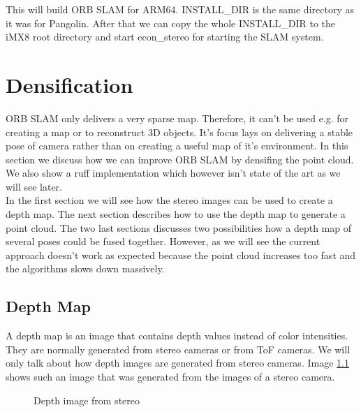 \documentclass[11pt,a4paper,titlepage,oneside]{report}
\begin{document}
This will build ORB SLAM for ARM64. INSTALL\_DIR is the same directory as it was for Pangolin. After that we can copy the whole INSTALL\_DIR to the iMX8 root directory and start econ\_stereo for starting the SLAM system.

\chapter{Densification}

ORB SLAM only delivers a very sparse map. Therefore, it can't be used e.g. for creating a map or to reconstruct 3D objects. It's focus lays on delivering a stable pose of camera rather than on creating a useful map of it's environment. In this section we discuss how we can improve ORB SLAM by densifing the point cloud. We also show a ruff implementation which however isn't state of the art as we will see later.\\
In the first section we will see how the stereo images can be used to create a depth map. The next section describes how to use the depth map to generate a point cloud. The two last sections discusses two possibilities how a depth map of several poses could be fused together. However, as we will see the current approach doesn't work as expected because the point cloud increases too fast and the algorithms slows down massively.

\section{Depth Map}

A depth map is an image that contains depth values instead of color intensities. They are normally generated from stereo cameras or from ToF cameras. We will only talk about how depth images are generated from stereo cameras. Image \ref{fig:depth} shows such an image that was generated from the images of a stereo camera.

\begin{figure}[H]
	\centering
	\caption{Depth image from stereo}\label{fig:depth}
\end{figure}
\end{document}
